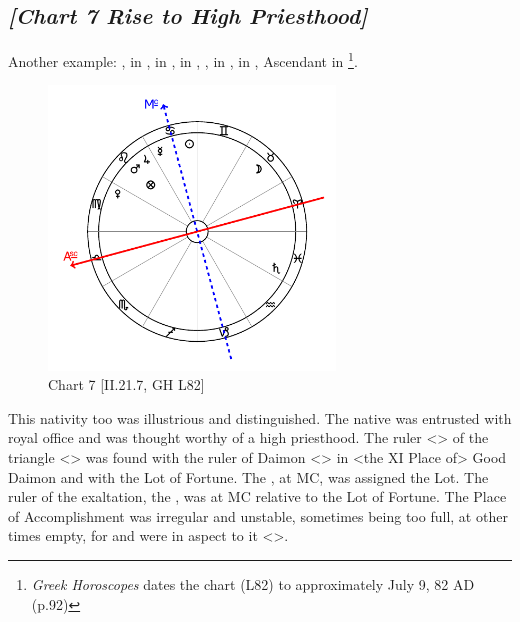 \newpage
\subsection*{\textit{[Chart 7 Rise to High Priesthood]}}

Another example: \Sun, \Mercury\xspace in \Cancer, \Moon\xspace in \Taurus, \Saturn\xspace in \Pisces, \Jupiter, \Mars\xspace in \Leo, \Venus\xspace in \Virgo, Ascendant in \Libra \footnote{\textit{Greek Horoscopes} dates the chart (L82) to approximately July 9, 82 AD (p.92)}.

\clearpage
\begin{figure}
\centering
\vspace{-20pt}
\includegraphics[width=0.68\textwidth]{charts/2_21_7}
\caption{Chart 7 [II.21.7, GH L82]}
\label{fig:chart07}
\end{figure}

This nativity too was illustrious and distinguished. The native was entrusted with royal office and was thought worthy of a high priesthood. The ruler <\Mars> of the triangle
<\Cancer\xspace \Scorpio\xspace \Pisces> was found with the ruler of Daimon <\Jupiter> in <the XI Place of> Good Daimon and with the Lot of Fortune. The \Sun, at MC, was assigned the Lot. The ruler of the exaltation, the \Moon, was at MC relative to the Lot of Fortune. The Place of Accomplishment was irregular and unstable, sometimes being too full, at other times empty, for \Saturn\xspace and \Venus\xspace were in aspect to it <\Square>.

\newpage

